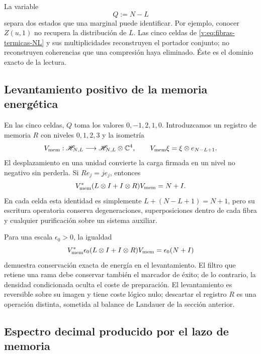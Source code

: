 La variable
\begin{equation}
 Q:=N-L
 \label{v:eq:carga-memoria-Q}
\end{equation}
separa dos estados que una marginal puede identificar. Por ejemplo, conocer
$Z(u,1)$ no recupera la distribución de $L$. Las cinco celdas de
\eqref{v:eq:fibras-termicas-NL} y sus multiplicidades reconstruyen el
portador conjunto; no reconstruyen coherencias que una compresión haya
eliminado. Éste es el dominio exacto de la lectura.

\subsection{Levantamiento positivo de la memoria energética}

En las cinco celdas, $Q$ toma los valores $0,-1,2,1,0$. Introduzcamos un
registro de memoria $R$ con niveles $0,1,2,3$ y la isometría
\begin{equation}
 V_{\rm mem}:\mathscr H_{N,L}\longrightarrow
 \mathscr H_{N,L}\otimes\mathbb C^4,\qquad
 V_{\rm mem}\xi=\xi\otimes e_{N-L+1}.
 \label{v:eq:isometria-memoria-positiva}
\end{equation}
El desplazamiento en una unidad convierte la carga firmada en un nivel no
negativo sin perderla. Si $R e_j=j e_j$, entonces
\begin{equation}
 V_{\rm mem}^*(L\otimes I+I\otimes R)V_{\rm mem}=N+I.
 \label{v:eq:balance-positivo-memoria}
\end{equation}
En cada celda esta identidad es simplemente
$L+(N-L+1)=N+1$, pero su escritura operatoria conserva degeneraciones,
superposiciones dentro de cada fibra y cualquier purificación sobre un
sistema auxiliar.

Para una escala $\epsilon_0>0$, la igualdad
\begin{equation}
 V_{\rm mem}^*\epsilon_0(L\otimes I+I\otimes R)V_{\rm mem}
 =\epsilon_0(N+I)
 \label{v:eq:energia-lift-memoria}
\end{equation}
demuestra conservación exacta de energía en el levantamiento. El filtro que
retiene una rama debe conservar también el marcador de éxito; de lo contrario,
la densidad condicionada oculta el coste de preparación. El levantamiento es
reversible sobre su imagen y tiene coste lógico nulo; descartar el registro
$R$ es una operación distinta, sometida al balance de Landauer de la sección
anterior.

\subsection{Espectro decimal producido por el lazo de memoria}

